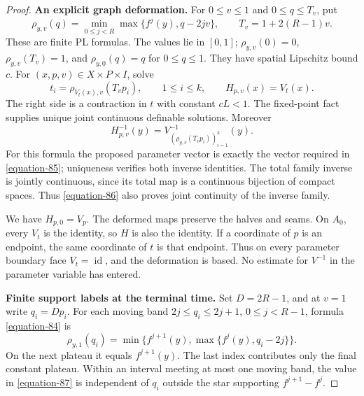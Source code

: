 \documentclass[11pt,a4paper]{article}
\theoremstyle{definition}
\begin{document}
\begin{proof}
\textbf{An explicit graph deformation.}\quad
For \(0\leq v\leq1\) and \(0\leq q\leq T_v\), put
\begin{equation}
 \rho_{y,v}(q)=
   \min_{0\leq j<R}\max\{f^j(y),q-2jv\},
 \qquad T_v=1+2(R-1)v.
 \label{equation-84}
\end{equation}
These are finite PL formulas. The values lie in \([0,1]\);
\(\rho_{y,v}(0)=0\), \(\rho_{y,v}(T_v)=1\),
and \(\rho_{y,0}(q)=q\) for \(0\leq q\leq1\).
They have spatial Lipschitz bound \(c\).
For \((x,p,v)\in X\times P\times I\), solve
\begin{equation}
 t_i=\rho_{V_t(x),v}(T_vp_i),\qquad 1\leq i\leq k,
 \qquad H_{p,v}(x)=V_t(x).
 \label{equation-85}
\end{equation}
The right side is a contraction in \(t\) with constant \(cL<1\).
The fixed-point fact supplies unique joint continuous definable
solutions. Moreover
\begin{equation}
 H_{p,v}^{-1}(y)=
 V^{-1}_{(\rho_{y,v}(T_vp_i))_{i=1}^k}(y).
 \label{equation-86}
\end{equation}
For this formula the proposed parameter vector is exactly the vector
required in \eqref{equation-85}; uniqueness verifies both inverse identities.
The total family inverse is jointly continuous, since its
total map is a continuous bijection of compact spaces. Thus \eqref{equation-86}
also proves joint continuity of the inverse family.

We have \(H_{p,0}=V_p\). The deformed maps preserve the halves and
seams. On \(A_0\), every \(V_t\) is the identity, so \(H\) is also
the identity. If a coordinate of \(p\) is an endpoint, the same
coordinate of \(t\) is that endpoint. Thus on every parameter boundary
face \(V_t=\operatorname{id}\), and the deformation is based.
No estimate for \(V^{-1}\) in the parameter variable has entered.

\textbf{Finite support labels at the terminal time.}\quad
Set \(D=2R-1\), and at \(v=1\) write \(q_i=Dp_i\).
For each moving band
\(2j\leq q_i\leq2j+1\), \(0\leq j<R-1\), formula \eqref{equation-84} is
\begin{equation}
 \rho_{y,1}(q_i)=
 \min\{f^{j+1}(y),\max\{f^j(y),q_i-2j\}\}.
 \label{equation-87}
\end{equation}
On the next plateau it equals \(f^{j+1}(y)\).
The last index contributes only the final constant plateau.
Within an interval meeting at most one moving band, the value in
\eqref{equation-87} is independent of \(q_i\) outside the star supporting
\(f^{j+1}-f^j\).


\end{proof}
\end{document}
